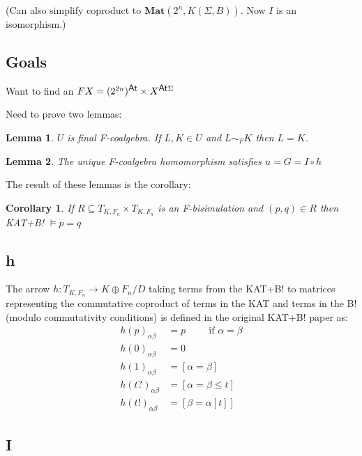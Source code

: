 \documentclass{article}
\newcommand{\atoms}{\textsf{\small{At}}}
\newcommand{\actions}{\Sigma}
\newcommand{\bisim}[1]{\sim_{#1}}
\newcommand{\mat}[1]{\textbf{Mat}(#1)}
\newcommand{\terms}{T_{K,F_n}}
\newcommand{\coproduct}{K \oplus F_n / D}
\newtheorem{corollary}{Corollary}
\newtheorem{lemma}{Lemma}
\begin{document}
  (Can also simplify coproduct to $\mat{2^n, K(\Sigma,B)}$. Now $I$ is an isomorphism.)

\subsection*{Goals}

Want to find an $F X = (2^{2n})^\atoms \times X^{\atoms\actions}$

Need to prove two lemmas:

\begin{lemma}
  $U$ is final F-coalgebra.
  If $L,K \in U$ and $L \bisim{F} K$ then $L = K$.
\end{lemma}

\begin{lemma}
  The unique F-coalgebra homomorphism satisfies $u = G = I \circ h$
\end{lemma}

The result of these lemmas is the corollary:
\begin{corollary}
  If $R \subseteq \terms \times \terms$ is an F-bisimulation and $(p,q) \in R$ then KAT+B! $\vDash p = q$
\end{corollary}


\subsection*{h}
The arrow $h : \terms \rightarrow \coproduct$ taking terms from the KAT+B! to matrices representing the commutative coproduct of terms in the KAT and terms in the B! (modulo commutativity conditions) is defined in the original KAT+B! paper as:
\begin{align*}
  h(p)_{\alpha\beta} &= p \hspace{1cm} \mbox{if $\alpha=\beta$}
\\h(0)_{\alpha\beta} &= 0
\\h(1)_{\alpha\beta} &= [\alpha = \beta]
\\h(t?)_{\alpha\beta} &= [\alpha = \beta \le t]
\\h(t!)_{\alpha\beta} &= [\beta = \alpha[t]]
\end{align*}

\subsection*{I}
\end{document}
